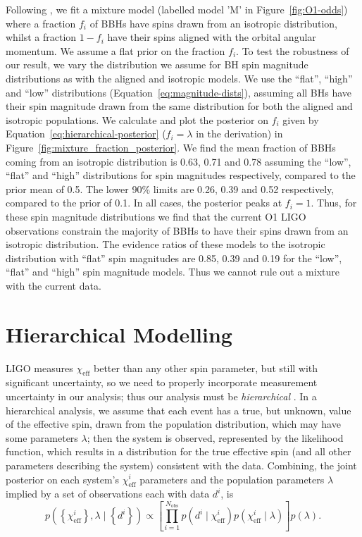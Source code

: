 \documentclass[modern,linenumbers]{aastex61}
\newcommand{\chieff}{\chi_\mathrm{eff}}
\begin{document}
Following \citet{Stevenson:2017spin}, we fit a mixture model (labelled
model 'M' in Figure~\ref{fig:O1-odds}) where a fraction $f_i$ of BBHs
have spins drawn from an isotropic distribution, whilst a fraction
$1 - f_i$ have their spins aligned with the orbital angular
momentum. We assume a flat prior on the fraction $f_i$. To test the
robustness of our result, we vary the distribution we assume for BH
spin magnitude distributions as with the aligned and isotropic
models. We use the ``flat'', ``high'' and ``low'' distributions
(Equation~\ref{eq:magnitude-dists}), assuming all BHs have their spin
magnitude drawn from the same distribution for both the aligned and
isotropic populations. We calculate and plot the posterior on $f_i$
given by Equation~\ref{eq:hierarchical-posterior} ($f_i=\lambda$ in
the derivation) in Figure~\ref{fig:mixture_fraction_posterior}. We
find the mean fraction of BBHs coming from an isotropic distribution
is 0.63, 0.71 and 0.78 assuming the ``low'', ``flat'' and ``high''
distributions for spin magnitudes respectively, compared to the prior
mean of 0.5. The lower 90\% limits are 0.26, 0.39 and 0.52
respectively, compared to the prior of 0.1. In all cases, the
posterior peaks at $f_i = 1$. Thus, for these spin magnitude
distributions we find that the current O1 LIGO observations constrain
the majority of BBHs to have their spins drawn from an isotropic
distribution. The evidence ratios of these models to the isotropic
distribution with ``flat'' spin magnitudes are 0.85, 0.39 and 0.19 for
the ``low'', ``flat'' and ``high'' spin magnitude models. Thus we
cannot rule out a mixture with the current data.

\section{Hierarchical Modelling} 
\label{sec:hierarchical}

LIGO measures $\chieff$ better than any other spin parameter, but
still with significant uncertainty, so we need to properly incorporate
measurement uncertainty in our analysis; thus our analysis must be
\emph{hierarchical} \citep{2010ApJ...725.2166H,2010PhRvD..81h4029M}.
In a hierarchical analysis, we assume that each event has a true, but
unknown, value of the effective spin, drawn from the population
distribution, which may have some parameters $\lambda$; then the
system is observed, represented by the likelihood function, which
results in a distribution for the true effective spin (and all other
parameters describing the system) consistent with the data.
Combining, the joint posterior on each system's $\chieff^i$ parameters
and the population parameters $\lambda$ implied by a set of
observations each with data $d^i$, is
\begin{equation}
  p\left( \left\{ \chieff^i \right\}, \lambda \mid \left\{ d^i \right\} \right) \propto \left[ \prod_{i=1}^{N_\mathrm{obs}} p\left(d^i \mid \chieff^i \right) p\left( \chieff^i \mid \lambda \right) \right] p\left(\lambda\right).
\end{equation}
\end{document}
